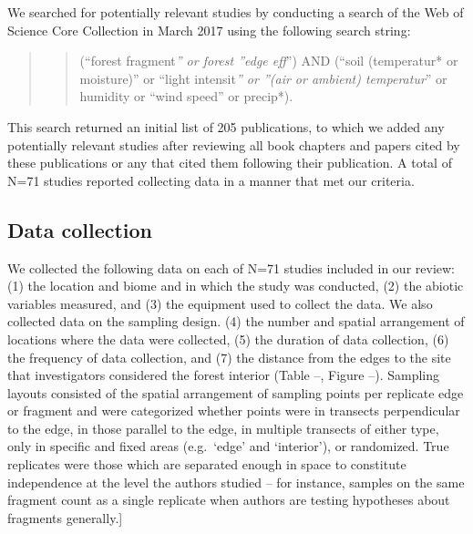 \documentclass[
  man]{apa6}
\begin{document}
We searched for potentially relevant studies by conducting a search of the Web of Science Core Collection in March 2017 using the following search string:
\bigskip  

\begin{quote}
\begin{quote}
(``forest fragment\emph{'' or forest ''edge eff}'') AND (``soil (temperatur* or moisture)'' or ``light intensit\emph{'' or ''(air or ambient) temperatur}'' or humidity or ``wind speed'' or precip*).
\end{quote}
\end{quote}

\bigskip

This search returned an initial list of 205 publications, to which we added any potentially relevant studies after reviewing all book chapters and papers cited by these publications or any that cited them following their publication. A total of N=71 studies reported collecting data in a manner that met our criteria.

\subsection{Data collection}\label{data-collection}

We collected the following data on each of N=71 studies included in our review: (1) the location and biome and in which the study was conducted, (2) the abiotic variables measured, and (3) the equipment used to collect the data. We also collected data on the sampling design. (4) the number and spatial arrangement of locations where the data were collected, (5) the duration of data collection, (6) the frequency of data collection, and (7) the distance from the edges to the site that investigators considered the forest interior (Table --, Figure --). Sampling layouts consisted of the spatial arrangement of sampling points per replicate edge or fragment and were categorized whether points were in transects perpendicular to the edge, in those parallel to the edge, in multiple transects of either type, only in specific and fixed areas (e.g.~`edge' and `interior'), or randomized. True replicates were those which are separated enough in space to constitute independence at the level the authors studied -- for instance, samples on the same fragment count as a single replicate when authors are testing hypotheses about fragments generally.{]}
\end{document}
